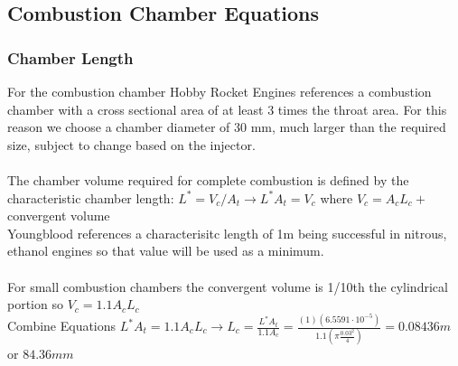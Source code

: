 \documentclass[12pt, letter paper]{article}
\begin{document}
		\subsection{Combustion Chamber Equations}
			
			\subsubsection{Chamber Length}
				For the combustion chamber Hobby Rocket Engines references a combustion chamber with a cross sectional area of at least 3 times the throat area. 
				For this reason we choose a chamber diameter of 30 mm, much larger than the required size, subject to change based on the injector. \\ \\
				The chamber volume required for complete combustion is defined by the characteristic chamber length: $ L^* = V_c/A_t \rightarrow L^* A_t = V_c $ where $ V_c = A_c L_c +$ convergent volume  \\
				Youngblood references a characterisitc length of 1m being successful in nitrous, ethanol engines so that value will be used as a minimum. \\ \\
				For small combustion chambers the convergent volume is 1/10th the cylindrical portion so $V_c = 1.1A_cL_c $ \\
				Combine Equations $ L^* A_t = 1.1A_cL_c \rightarrow L_c = \frac{L^* A_t}{1.1A_c} = \frac{(1) (6.5591 \cdot 10^{-5})}{1.1(\pi \frac{0.03^2}{4})} = 0.08436 m$ or $ 84.36 mm $
			
\end{document}
